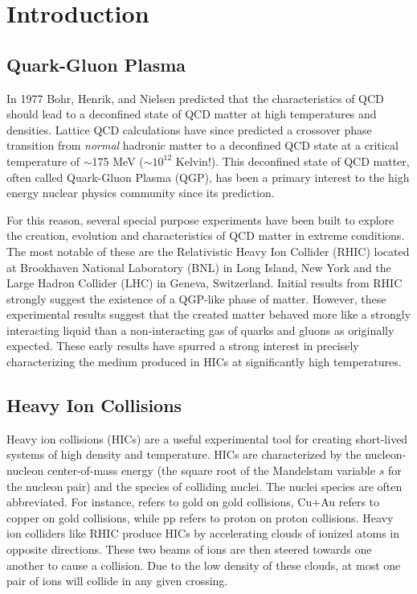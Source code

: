\section{Introduction}

	\subsection{Quark-Gluon Plasma}
	\label{sec:qgp}
	In 1977 Bohr, Henrik, and Nielsen predicted that the characteristics of QCD should lead to a deconfined state of QCD matter at high temperatures and densities\cite{bohr_hadron_1977}.  Lattice QCD calculations have since predicted a crossover phase transition from \textit{normal} hadronic matter to a deconfined QCD state at a critical temperature of $\sim$175 MeV ($\sim10^{12}$ Kelvin!)\cite{karsch_phase_1995}. This deconfined state of QCD matter, often called Quark-Gluon Plasma (QGP), has been a primary interest to the high energy nuclear physics community since its prediction. 

	For this reason, several special purpose experiments have been built to explore the creation, evolution and characteristics of QCD matter in extreme conditions. The most notable of these are the Relativistic Heavy Ion Collider (RHIC) located at Brookhaven National Laboratory (BNL) in Long Island, New York and the Large Hadron Collider (LHC) in Geneva, Switzerland. Initial results from RHIC strongly suggest the existence of a QGP-like phase of matter. However, these experimental results suggest that the created matter behaved more like a strongly interacting liquid than a non-interacting gas of quarks and gluons as originally expected\cite{bohr_hadron_1977}. These early results have spurred a strong interest in precisely characterizing the medium produced in HICs at significantly high temperatures. 

	\subsection{Heavy Ion Collisions}
	\label{sec:hic}
	Heavy ion collisions (HICs) are a useful experimental tool for creating short-lived systems of high density and temperature. HICs are characterized by the nucleon-nucleon center-of-mass energy \snn (the square root of the Mandelstam variable $s$ for the nucleon pair) and the species of colliding nuclei. The nuclei species are often abbreviated. For instance, \auau refers to gold on gold collisions, Cu$+$Au refers to copper on gold collisions, while pp refers to proton on proton collisions. Heavy ion colliders like RHIC produce HICs by accelerating clouds of ionized atoms in opposite directions. These two beams of ions are then steered towards one another to cause a collision. Due to the low density of these clouds, at most one pair of ions will collide in any given crossing. 


